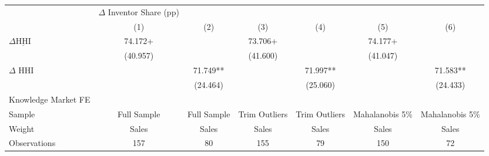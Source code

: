 {
\def\sym#1{\ifmmode^{#1}\else\(^{#1}\)\fi}
\begin{tabular}{l*{6}{c}}
\hline\hline
                    &$\Delta$ Inventor Share (pp)   &               &               &               &               &               \\
                    &\multicolumn{1}{c}{(1)}   &\multicolumn{1}{c}{(2)}   &\multicolumn{1}{c}{(3)}   &\multicolumn{1}{c}{(4)}   &\multicolumn{1}{c}{(5)}   &\multicolumn{1}{c}{(6)}   \\
\hline
$\Delta \underline{\text{HHI}}$&      74.172+  &               &      73.706+  &               &      74.177+  &               \\
                    &    (40.957)   &               &    (41.600)   &               &    (41.047)   &               \\
$\Delta$ HHI        &               &      71.749** &               &      71.997** &               &      71.583** \\
                    &               &    (24.464)   &               &    (25.060)   &               &    (24.433)   \\
\hline
Knowledge Market FE &               &               &               &               &               &               \\
Sample              & Full Sample   & Full Sample   &Trim Outliers   &Trim Outliers   &Mahalanobis 5\%   &Mahalanobis 5\%   \\
Weight              &       Sales   &       Sales   &       Sales   &       Sales   &       Sales   &       Sales   \\
Observations        &         157   &          80   &         155   &          79   &         150   &          72   \\
\hline\hline
\end{tabular}
}
